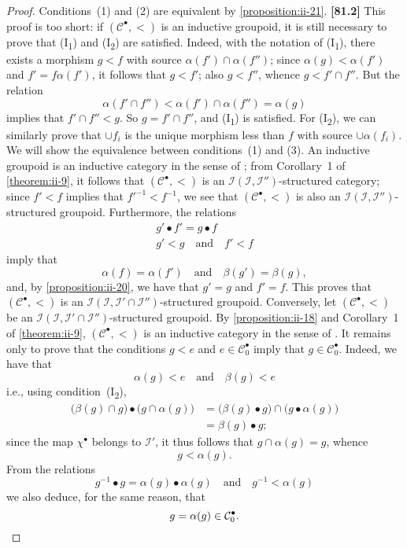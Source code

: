 \documentclass[a4paper,fleqn]{article}
\theoremstyle{plain}
\theoremstyle{definition}
\newenvironment{longcomm}[1]
  {\noindent\textbf{[#1]}\rmfamily}
  {}
\newcommand{\oldpage}[1]{{\marginpar{\footnotesize$\bigg\vert$\,\,\,\,\textit{p.~#1}}}}
\newcommand{\textand}{\quad\text{and}\quad}
\newcommand{\CC}{\mathcal{C}}
\newcommand{\II}{\mathcal{I}}
\newcommand{\smallbullet}{\bullet}
\begin{document}
\begin{proof}
  Conditions~(1) and (2) are equivalent by \cref{proposition:ii-21}.
  \begin{longcomm}{81.2}
    This proof is too short: if $(\CC^\smallbullet,<)$ is an inductive groupoid, it is still necessary to prove that (I\textsubscript{1}) and (I\textsubscript{2}) are satisfied.
    Indeed, with the notation of (I\textsubscript{1}), there exists a morphism $g<f$ with source $\alpha(f')\cap\alpha(f'')$;
    since $\alpha(g)<\alpha(f')$ and $f'=f\alpha(f')$, it follows that $g<f'$;
    also $g<f''$, whence $g<f'\cap f''$.
    But the relation
    \[
      \alpha(f'\cap f'')
      < \alpha(f')\cap\alpha(f'')
      = \alpha(g)
    \]
    implies that $f'\cap f''<g$.
    So $g=f'\cap f''$, and (I\textsubscript{1}) is satisfied.
    For (I\textsubscript{2}), we can similarly prove that $\cup f_i$ is the unique morphism less than $f$ with source $\cup\alpha(f_i)$.
  \end{longcomm}
  We will show the equivalence between conditions~(1) and (3).
  An inductive groupoid is an inductive category in the sense of \cite{3c};
  from Corollary~1 of \cref{theorem:ii-9}, it follows that $(\CC^\smallbullet,<)$ is an $\II(\II,\II'')$-structured category;
  since $f'<f$ implies that $f'^{-1}<f^{-1}$, we see that $(\CC^\smallbullet,<)$ is also an $\II(\II,\II'')$-structured groupoid.
  Furthermore, the relations
  \[
    \begin{gathered}
      g'\smallbullet f'=g\smallbullet f
    \\g'<g
      \textand
      f'<f
    \end{gathered}
  \]
  imply that
  \[
    \alpha(f)=\alpha(f')
    \textand
    \beta(g')=\beta(g),
  \]
  and, by \cref{proposition:ii-20}, we have that $g'=g$ and $f'=f$.
  This proves that $(\CC^\smallbullet,<)$ is an $\II(\II,\II'\cap\II'')$-structured groupoid.
  Conversely, let $(\CC^\smallbullet,<)$ be an $\II(\II,\II'\cap\II'')$-structured groupoid.
  By \cref{proposition:ii-18} and Corollary~1 of \cref{theorem:ii-9}, $(\CC^\smallbullet,<)$ is an inductive category in the sense of \cite{3c}.
  \oldpage{410}
  It remains only to prove that the conditions $g<e$ and $e\in\CC_0^\smallbullet$ imply that $g\in\CC_0^\smallbullet$.
  Indeed, we have that
  \[
    \alpha(g)<e
    \textand
    \beta(g)<e
  \]
  i.e., using condition~(I\textsubscript{2}),
  \[
    \begin{aligned}
      \big(\beta(g)\cap g\big)\smallbullet\big(g\cap\alpha(g)\big)
      &= \big(\beta(g)\smallbullet g\big)\cap\big(g\smallbullet\alpha(g)\big)
    \\&= \beta(g)\smallbullet g;
    \end{aligned}
  \]
  since the map $\chi^\smallbullet$ belongs to $\II'$, it thus follows that $g\cap\alpha(g)=g$, whence
  \[
    g<\alpha(g).
  \]
  From the relations
  \[
    g^{-1}\smallbullet g=\alpha(g)\smallbullet\alpha(g)
    \textand
    g^{-1}<\alpha(g)
  \]
  we also deduce, for the same reason, that
  \[
    g
    = \alpha(g)
    \in \CC_0^\smallbullet.
    \qedhere
  \]
\end{proof}
\end{document}
